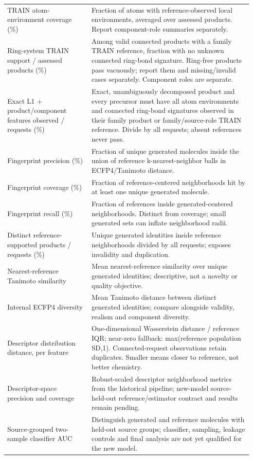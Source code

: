 \begin{longtable}{@{}>{\raggedright\arraybackslash}p{}>{\raggedright\arraybackslash}p{}@{}}
TRAIN atom-environment coverage (\%) & Fraction of atoms with reference-observed local environments, averaged over assessed products. Report component-role summaries separately. \\
Ring-system TRAIN support / assessed products (\%) & Among valid connected products with a family TRAIN reference, fraction with no unknown connected ring-bond signature. Ring-free products pass vacuously; report them and missing/invalid cases separately. Component roles are separate. \\
Exact L1 + product/component features observed / requests (\%) & Exact, unambiguously decomposed product and every precursor must have all atom environments and connected ring-bond signatures observed in their family product or family/source-role TRAIN reference. Divide by all requests; absent references never pass. \\
Fingerprint precision (\%) & Fraction of unique generated molecules inside the union of reference k-nearest-neighbor balls in ECFP4/Tanimoto distance. \\
Fingerprint coverage (\%) & Fraction of reference-centered neighborhoods hit by at least one unique generated molecule. \\
Fingerprint recall (\%) & Fraction of references inside generated-centered neighborhoods. Distinct from coverage; small generated sets can inflate neighborhood radii. \\
Distinct reference-supported products / requests (\%) & Unique generated identities inside reference neighborhoods divided by all requests; exposes invalidity and duplication. \\
Nearest-reference Tanimoto similarity & Mean nearest-reference similarity over unique generated identities; descriptive, not a novelty or quality objective. \\
Internal ECFP4 diversity & Mean Tanimoto distance between distinct generated identities; compare alongside validity, realism and component diversity. \\
Descriptor distribution distance, per feature & One-dimensional Wasserstein distance / reference IQR; near-zero fallback: max(reference population SD,1). Connected-request observations retain duplicates. Smaller means closer to reference, not better chemistry. \\
Descriptor-space precision and coverage & Robust-scaled descriptor neighborhood metrics from the historical pipeline; new-model source-held-out reference/estimator contract and results remain pending. \\
Source-grouped two-sample classifier AUC & Distinguish generated and reference molecules with held-out source groups; classifier, sampling, leakage controls and final analysis are not yet qualified for the new model. \\
\end{longtable}\endgroup
